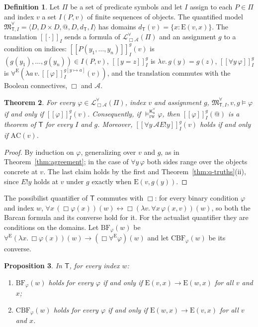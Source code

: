 \documentclass[11pt]{amsart}
\makeatletter
\theoremstyle{plain}
\newtheorem{theorem}{Theorem}[section]
\newtheorem{proposition}[theorem]{Proposition}
\theoremstyle{definition}
\newtheorem{definition}[theorem]{Definition}
\theoremstyle{remark}
\newcommand{\Act}{\mathcal{A}}
\newcommand{\Lang}{\mathcal{L}_{\Box\Act}}
\newcommand{\Mod}{\mathfrak{M}}
\newcommand{\Kl}{\mathsf{K}}
\newcommand{\at}{@}
\newcommand{\RWv}[1]{\models^{#1}_{\mathrm{rw}}}
\newcommand{\Conc}{\mathrm{E}}
\newcommand{\Dom}{D}
\newcommand{\T}{\mathsf{T}}
\newcommand{\tr}[1]{[\![#1]\!]}
\makeatother
\begin{document}
\begin{definition}
Let $\Pi$ be a set of predicate symbols and let $I$ assign to each
$P \in \Pi$ and index $v$ a set $I(P,v)$ of finite sequences of
objects. The quantified model $\Mod^\forall_{\T,I} = \langle \Dom,
\Dom \times \Dom, \at, \Dom, d_\T, I\rangle$ has domains
$d_\T(v) = \{x : \Conc(v,x)\}$. The translation $\tr{\cdot}_I$
sends a formula of $\Lang^\forall(\Pi)$ and an assignment $g$ to a
condition on indices: $\tr{P(y_1,\ldots,y_n)}_I^g(v)$ is
$(g(y_1),\ldots,g(y_n)) \in I(P,v)$, $\tr{y = z}_I^g$ is
$\lambda v.\,g(y) = g(z)$, $\tr{\forall y\,\varphi}_I^g$ is
$\forall^{\Conc}(\lambda a\,v.\,\tr{\varphi}_I^{g[y\mapsto a]}(v))$,
and the translation commutes with the Boolean connectives, $\Box$ and
$\Act$.
\end{definition}

\begin{theorem}
\label{thm:q-agreement}
For every $\varphi \in \Lang^\forall(\Pi)$, index $v$ and
assignment $g$, $\Mod^\forall_{\T,I}, v, g \models \varphi$ if and
only if $\tr{\varphi}_I^g(v)$. Consequently, if
$\RWv{\Kl^\forall_{\mathrm{u}}} \varphi$, then
$\tr{\varphi}_I^g(\at)$ is a theorem of $\T$ for every $I$ and $g$.
Moreover, $\tr{\forall y\,\Act E!y}_I^g(v)$ holds if and only if
$\mathrm{AC}(v)$.
\end{theorem}

\begin{proof}
By induction on $\varphi$, generalizing over $v$ and $g$, as in
Theorem~\ref{thm:agreement}; in the case of $\forall y\,\varphi$
both sides range over the objects concrete at $v$. The last claim
holds by the first and Theorem~\ref{thm:q-truths}(ii), since $E!y$ holds at $v$
under $g$ exactly when $\Conc(v, g(y))$.
\end{proof}

The possibilist quantifier of $\T$ commutes with $\Box$: for every
binary condition $\varphi$ and index $w$,
$\forall x\,(\Box\varphi(x))(w) \leftrightarrow
\Box(\lambda v.\,\forall x\,\varphi(x,v))(w)$, so both the Barcan
formula \cite{barcan1946} and its converse hold for it. For the
actualist quantifier they are conditions on the domains. Let
$\mathrm{BF}_\varphi(w)$ be
$\forall^{\Conc}(\lambda x.\,\Box\varphi(x))(w) \to
(\Box\forall^{\Conc}\varphi)(w)$ and let $\mathrm{CBF}_\varphi(w)$ be
its converse.

\begin{proposition}
\label{prop:barcan}
In $\T$, for every index $w$:
\begin{enumerate}[label=(\roman*)]
\item $\mathrm{BF}_\varphi(w)$ holds for every $\varphi$ if and only if
  $\Conc(v,x) \to \Conc(w,x)$ for all $v$ and $x$;
\item $\mathrm{CBF}_\varphi(w)$ holds for every $\varphi$ if and only if
  $\Conc(w,x) \to \Conc(v,x)$ for all $v$ and $x$.
\end{enumerate}
\end{proposition}
\end{document}
